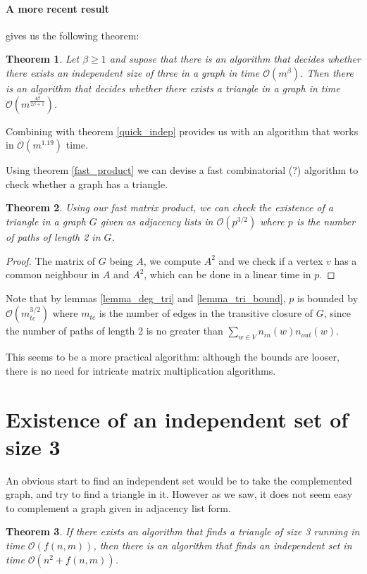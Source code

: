 \documentclass[11pt,a4paper]{article}
\newcommand{\BigO}{\mathcal O}
\newtheorem{Theo}{Theorem}
\theoremstyle{definition}
\begin{document}
\paragraph{A more recent result}
 \cite{Durand2011574} gives us the following theorem:
\begin{Theo}
Let $\beta \geq 1$ and supose that there is an algorithm that decides
whether there exists an independent size of three in a graph
in time $\BigO(m^\beta)$. Then there is an algorithm that decides whether there
exists a triangle in a graph in time $\BigO(m^{\frac{4\beta}{2\beta+1}})$.
\end{Theo}
Combining with theorem \ref{quick_indep} provides us with an algorithm that 
works in $\BigO(m^{1.19})$ time.

Using theorem \ref{fast_product} we can devise a fast combinatorial (?)
 algorithm to
check whether a graph has a triangle.
\begin{Theo}
Using our fast matrix product, we can check the existence of a triangle
in a graph $G$ given as adjacency lists in $\BigO(p^{3/2})$ where
$p$ is the number of paths of length 2 in $G$.
\end{Theo}
\begin{proof}
The matrix of $G$ being $A$, we compute $A^2$ and we check if a
vertex $v$ has a common neighbour in $A$ and $A^2$, which can be
done in a linear time in $p$.
\end{proof}
Note that by lemmas \ref{lemma_deg_tri} and \ref{lemma_tri_bound}, $p$ is
bounded by $\BigO(m_{tc}^{3/2})$ where $m_{tc}$ is
the number of edges in the transitive closure of $G$, since
the number of paths of length 2 is no greater than
$\sum_{w\in V}n_{in}(w)n_{out}(w)$.

This seems to be a more practical algorithm: although the bounds
are looser, there is no need for intricate matrix multiplication
algorithms.

\section{Existence of an independent set of size 3}
An obvious start to find an independent set would be to take the complemented
graph, and try to find a triangle in it. However as we saw, it does not seem 
easy to complement a graph given in adjacency list form.
\begin{Theo}
If there exists an algorithm that finds a triangle of size 3 running
in time $\BigO(f(n,m))$, then there is an algorithm that finds an independent
set in time $\BigO(n^2 + f(n,m))$.
\end{Theo}
\end{document}
